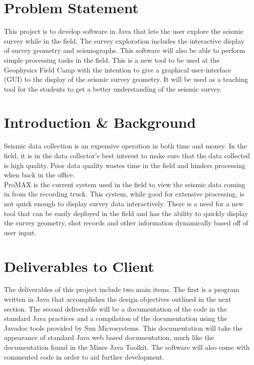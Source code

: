 \documentclass[12pt]{article}
\begin{document}
\newpage
\tableofcontents
\listoffigures
\listoftables
\newpage

\section{Problem Statement}

This project is to develop software in Java that lets the user explore the seismic survey while in the field. The survey exploration includes the interactive display of survey geometry and seismographs. This software will also be able to perform simple processing tasks in the field. This is a new tool to be used at the Geophysics Field Camp with the intention to give a graphical user-interface (GUI) to the display of the seismic survey geometry. It will be used as a teaching tool for the students to get a better understanding of the seismic survey.

\section{Introduction \& Background}

Seismic data collection is an expensive operation in both time and money. In the field, it is in the data collector's best interest to make sure that the data collected is high quality. Poor data quality wastes time in the field and hinders processing when back in the office. \\

ProMAX is the current system used in the field to view the seismic data coming in from the recording truck. This system, while good for extensive processing, is not quick enough to display survey data interactively. There is a need for a new tool that can be easily deployed in the field and has the ability to quickly display the survey geometry, shot records and other information dynamically based off of user input.

\section{Deliverables to Client}

The deliverables of this project include two main items. The first is a program written in Java that accomplishes the design objectives outlined in the next section. The second deliverable will be a documentation of the code in the standard Java practices and a compilation of the documentation using the Javadoc tools provided by Sun Microsystems. This documentation will take the appearance of standard Java web based documentation, much like the documentation found in the Mines Java Toolkit. The software will also come with commented code in order to aid further development. 
\end{document}
